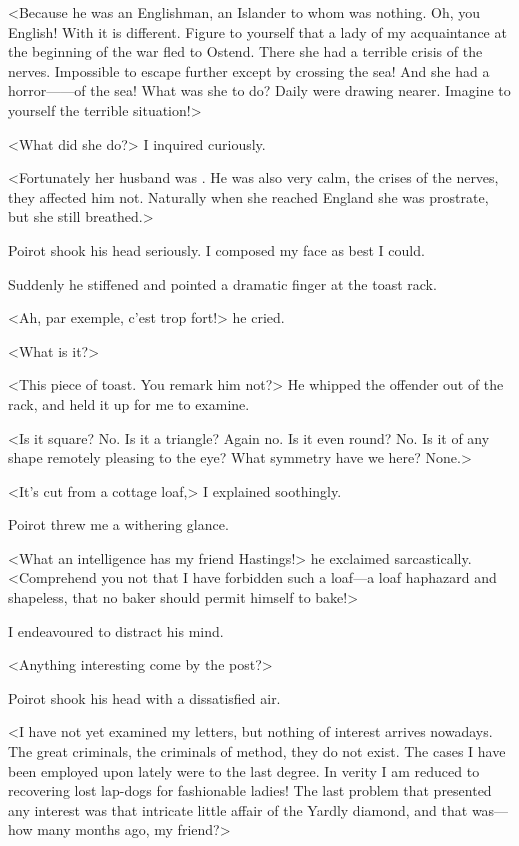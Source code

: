  <Because he was an Englishman, an Islander to whom  was nothing. Oh, you English! With  it is different. Figure to yourself that a lady of my acquaintance at the beginning of the war fled to Ostend. There she had a terrible crisis of the nerves. Impossible to escape further except by crossing the sea! And she had a horror——of the sea! What was she to do? Daily  were drawing nearer. Imagine to yourself the terrible situation!> 

 <What did she do?> I inquired curiously. 

 <Fortunately her husband was . He was also very calm, the crises of the nerves, they affected him not.  Naturally when she reached England she was prostrate, but she still breathed.> 

 Poirot shook his head seriously. I composed my face as best I could. 

 Suddenly he stiffened and pointed a dramatic finger at the toast rack. 

 <Ah, par exemple, c'est trop fort!> he cried. 

 <What is it?> 

 <This piece of toast. You remark him not?> He whipped the offender out of the rack, and held it up for me to examine. 

 <Is it square? No. Is it a triangle? Again no. Is it even round? No. Is it of any shape remotely pleasing to the eye? What symmetry have we here? None.> 

 <It's cut from a cottage loaf,> I explained soothingly. 

 Poirot threw me a withering glance. 

 <What an intelligence has my friend Hastings!> he exclaimed sarcastically. <Comprehend you not that I have forbidden such a loaf—a loaf haphazard and shapeless, that no baker should permit himself to bake!> 

 I endeavoured to distract his mind. 

 <Anything interesting come by the post?> 

 Poirot shook his head with a dissatisfied air. 

 <I have not yet examined my letters, but nothing of interest arrives nowadays. The great criminals, the criminals of method, they do not exist. The cases I have been employed upon lately were  to the last degree. In verity I am reduced to recovering lost lap-dogs for fashionable ladies! The last problem that presented any interest was that intricate little affair of the Yardly diamond, and that was—how many months ago, my friend?> 

